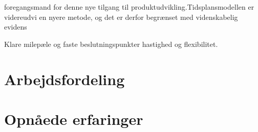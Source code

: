   foregangsmand for denne nye tilgang til   produktudvikling.Tidsplansmodellen er videreudvi en nyere metode, og det er derfor begrænset med videnskabelig evidens


Klare milepæle og faste beslutningspunkter
hastighed og flexibilitet. 

	
	
\section{Arbejdsfordeling}

\section{Opnåede erfaringer}